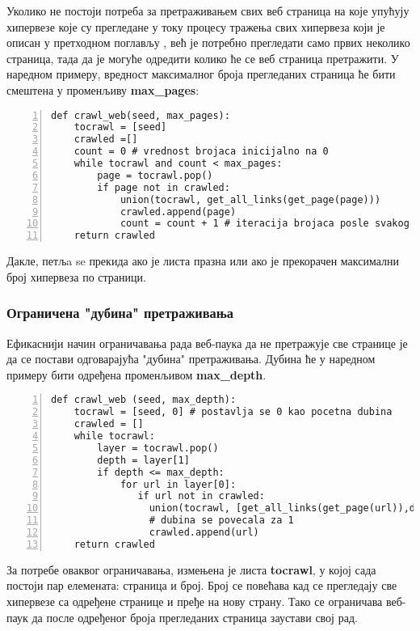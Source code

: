 Уколико не постоји потреба за претраживањем свих веб страница на које упућују хипервезе које су прегледане у току процесу тражења свих хипервеза који је описан у претходном поглављу , већ је потребно прегледати само првих неколико страница, тада да је могуће одредити колико ће се веб страница претражити. У наредном примеру, вредност максималног броја прегледаних страница ће бити смештена у променљиву \textbf{max\_pages}:

\begin{lstlisting}[caption=Претраживање са ограниченим бројем страна, label={lst:crawlweb2}, numbers=left]
def crawl_web(seed, max_pages):
    tocrawl = [seed]
    crawled =[]
    count = 0 # vrednost brojaca inicijalno na 0
    while tocrawl and count < max_pages:
        page = tocrawl.pop()
        if page not in crawled:
            union(tocrawl, get_all_links(get_page(page)))
            crawled.append(page)
            count = count + 1 # iteracija brojaca posle svakog linka
    return crawled
\end{lstlisting}

Дакле, петљa se прекида ако је листа празна или ако је прекорачен максимални број хипервеза по страници.

\subsubsection{Ограничена "дубина" претраживања}

Ефикаснији начин ограничавања рада веб-паука да не претражује све странице је да се постави одговарајућа "дубина" претраживања. Дубина ће у наредном примеру бити одређена променљивом \textbf{max\_depth}.

\begin{lstlisting}[caption=Скенирање ограничено по дубини, label={lst:crawlweb3}, numbers=left]
def crawl_web (seed, max_depth):
    tocrawl = [seed, 0] # postavlja se 0 kao pocetna dubina
    crawled = []
    while tocrawl:
        layer = tocrawl.pop()
        depth = layer[1]
        if depth <= max_depth:
            for url in layer[0]:
               if url not in crawled:
                 union(tocrawl, [get_all_links(get_page(url)),depth+1])
                 # dubina se povecala za 1
                 crawled.append(url)
    return crawled
\end{lstlisting}

За потребе оваквог ограничавања, измењена је листа \textbf{tocrawl}, у којој сада постоји пар елемената: страница и број. Број се повећава кад се прегледају све хипервезе са одређене странице и пређе на нову страну. Тако се  ограничава веб-паук да после одређеног броја прегледаних страница заустави свој рад.
\pagebreak
